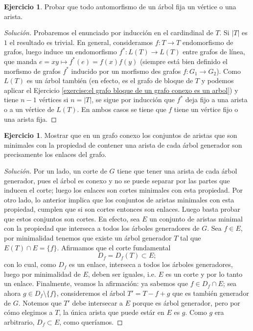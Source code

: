 \documentclass[12pt]{report}
\theoremstyle{plain}
\theoremstyle{definition}
\newtheorem{exercise}[theorem]{Ejercicio}
\newenvironment{solution}{\begin{proof}[Solución]}{\end{proof}}
\newcommand{\abs}[1]{\left \vert #1 \right \vert}
\begin{document}
\begin{exercise}\label{ejercicio:todo automorfismo de un árbol tiene un vertice o arista fijos}
Probar que todo automorfismo de un árbol fija un vértice o una arista.
\end{exercise}
\begin{solution}
Probaremos el enunciado por inducción en el cardindinal de $T$. Si $\abs T$ es $1$ el resultado es trivial.
En general, consideramos $f : T \rightarrow T$ endomorfismo de grafos, luego induce un endomorfismo $f^* : L
(T) \rightarrow L(T)$ entre grafos de línea, que manda $e = xy \mapsto f^*(e) = f(x)f(y)$ (siempre está bien
definido el morfismo de grafos $f^*$ inducido por un morfismo des grafos $f : G_1 \rightarrow G_2$). Como
$L(T)$ es un árbol también (en efecto, es el grafo de bloque de $T$ y podemos aplicar el Ejercicio \ref{exercise:el grafo bloque de un grafo conexo es un arbol}) y tiene $n-1$ vértices si $n= \abs T$,
se sigue por inducción que $f^*$ deja fijo a una arista o a un vértice de $L(T)$. En ambos casos se tiene que $f$ tiene un vértice fijo o una arista fija.
\end{solution}



\begin{exercise}
Mostrar que en un grafo conexo los conjuntos de aristas que son minimales con la propiedad de contener una arista
de cada árbol generador son precisamente los enlaces del grafo.
\end{exercise}
\begin{solution}
Por un lado, un corte de $G$ tiene que tener una arista de cada árbol generador, pues el árbol es conexo y no se
puede separar por las partes que inducen el corte; luego los enlaces son cortes minimales con esta propiedad. Por otro
lado, lo anterior implica que los conjuntos de aristas minimales con esta propiedad, cumplen que si son cortes
entonces son enlaces. Luego basta probar que estos conjuntos son cortes. En efecto, sea $E$ un conjunto de
aristas minimal con la propiedad que interseca a todos los árboles generadores de $G$. Sea $f \in E$, por
minimalidad tenemos que existe un árbol generador $T$ tal que $E(T) \cap E = \{f \}$. Afirmamos que el corte
fundamental
\[
    D_f = D_f(T) \subset E;
\]
con lo cual, como $D_f$ es un enlace, interseca a todos los árboles generadores, luego por minimalidad de $E$,
deben ser iguales, i.e. $E$ es un corte y por lo tanto un enlace. Finalmente, veamos la afirmación: ya sabemos que $f \in D_f \cap E$; sea ahora $g \in D_f \setminus \{f\}$, consideremos el árbol $T' = T - f + g$ que es también generador de $G$. Notemos que $T'$ debe intersecar a $E$ porque es árbol generador, pero por cómo elegimos a $T$, la única arista que puede estár en $E$ es $g$. Como $g$ era arbitrario, $D_f \subset E$, como queríamos.
\end{solution}
\end{document}
